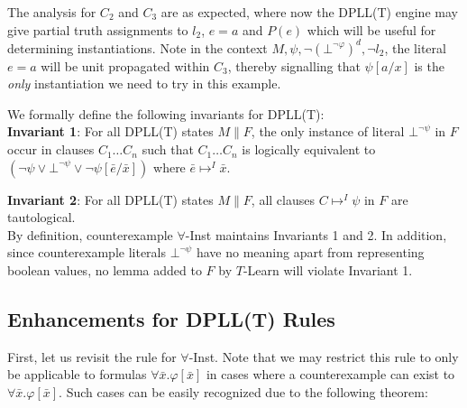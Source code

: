 \documentclass{llncs}
\begin{document}
The analysis for $C_2$ and $C_3$ are as expected, where now the DPLL(T) engine may give partial truth assignments to $l_2$, $e = a$ and $P( e )$ which will be useful for determining instantiations.
Note in the context $M, \psi, \neg( \bot^{\neg \varphi} )^d, \neg l_2$, the literal $e = a$ will be unit propagated within $C_3$, thereby signalling that $\psi[ a/x]$ is the \emph{only} instantiation we need to try in this example.

We formally define the following invariants for DPLL(T): \\

{\bf Invariant 1}:
For all DPLL(T) states $M \parallel F$, the only instance of literal $\bot^{\neg \psi}$ in $F$ occur in clauses $C_1 \ldots C_n$ such that $C_1 \ldots C_n$ is logically equivalent to $( \neg \psi \vee \bot^{\neg \psi} \vee \neg \psi[\bar{e}/\bar{x}] )$ where $\bar{e} \mapsto^I \bar{x}$.

{\bf Invariant 2}:
For all DPLL(T) states $M \parallel F$, all clauses $C \mapsto^I \psi$ in $F$ are tautological. \\

By definition, counterexample $\forall$-Inst maintains Invariants 1 and 2.
In addition, since counterexample literals $\bot^{ \neg \psi }$ have no meaning apart from representing boolean values, no lemma added to $F$ by $T$-Learn will violate Invariant 1.

\subsection{Enhancements for DPLL(T) Rules}

First, let us revisit the rule for $\forall$-Inst.
Note that we may restrict this rule to only be applicable to formulas $\forall \bar{x}. \varphi[ \bar{ x } ]$ in cases where a counterexample can exist to $\forall \bar{x}. \varphi[ \bar{ x } ]$.
Such cases can be easily recognized due to the following theorem:
\end{document}
